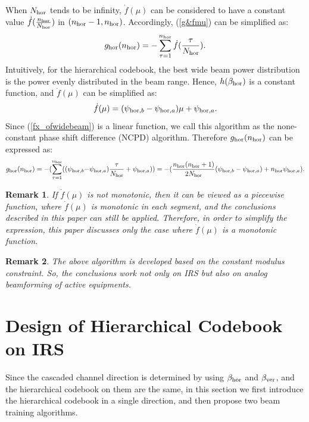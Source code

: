\documentclass[12pt,draftclsnofoot,onecolumn]{IEEEtran}
\begin{document}
	
	When $N_{\rm hor}$ tends to be infinity, $\dot{f}(\mu)$ can be considered to have  a constant value $\dot{f}(\frac{n_{\rm hor}}{N_{\rm hor}})$ in $(n_{\rm hor}-1,n_{\rm hor})$.
	Accordingly, (\ref{g&fmu}) can be simplified as:
	\begin{equation}\label{discrete phaseshift}
		g_{\rm hor}(n_{\rm hor}) = -\sum\limits_{\tau = 1}^{n_{\rm hor}} {\dot{f}(\frac{\tau}{N_{\rm hor}}} ).
	\end{equation}	
	Intuitively, for the  hierarchical codebook, the best wide beam power distribution is the  power evenly distributed in the beam range. Hence, $h(\beta_{\rm hor})$ is a constant function, and  $\dot{f}(\mu)$ can be simplified as:
	\begin{equation}\label{fx_ofwidebeam}
		\dot{f}(\mu)=(\psi_{{\rm hor},b}-\psi_{{\rm hor},a}) \mu + \psi_{{\rm hor},a}.
	\end{equation}
	Since (\ref{fx_ofwidebeam}) is a linear function,  we call this algorithm as the  none-constant phase shift difference (NCPD) algorithm.
	Therefore $g_{\rm hor}(n_{\rm hor})$ can be expressed  as:
	\begin{equation}\label{anasou}
		g_{\rm hor}(n_{\rm hor}) = -(\sum\limits_{\tau = 1}^{n_{\rm hor}}( {({\psi _{{\rm hor},b}} - } {\psi _{{\rm hor},a}})\frac{\tau}{N_{\rm hor}} + {\psi _{{\rm hor},a}}))\\
		=-(\frac{{{n_{\rm hor}}(n_{\rm hor} + 1)}}{{2N_{\rm hor}}}({\psi _{{\rm hor},b}} - {\psi _{{\rm hor},a}}) + n_{\rm hor}{\psi _{{\rm hor},a}}).
	\end{equation}
	\newtheorem{remark}{Remark}
	\begin{remark}
		If $\dot{f}(\mu)$ is not monotonic, then it can be viewed as a piecewise function, where $\dot{f}(\mu)$ is monotonic in each segment, and the conclusions described in this paper can still be applied. Therefore, in order to simplify the expression, this paper discusses only the case where $\dot{f}(\mu)$ is a monotonic function.
	\end{remark}
	\begin{remark}
		The above algorithm is developed based on the constant modulus constraint. So, the conclusions work not only on IRS but also on analog beamforming of active equipments.
	\end{remark}
	
	
	\section{Design of Hierarchical Codebook on IRS}
	Since the  cascaded channel direction is determined by using  $\beta_{\rm hor}$ and $\beta_{\rm ver}$, and the hierarchical codebook on them are the  same, in this section we first introduce the hierarchical codebook in a single direction, and then propose two  beam training algorithms.
	
\end{document}
